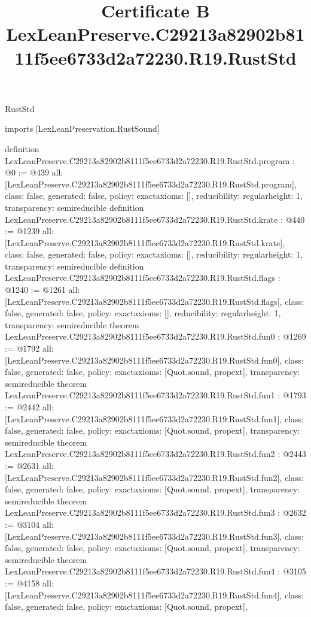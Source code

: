 \begin{lexlean}{RustStd}
\title{Certificate B LexLeanPreserve.C29213a82902b8111f5ee6733d2a72230.R19.RustStd}
\begin{coremodule}
imports [LexLeanPreservation.RustSound]

definition LexLeanPreserve.C29213a82902b8111f5ee6733d2a72230.R19.RustStd.program : @0 := @439 {
  all: [LexLeanPreserve.C29213a82902b8111f5ee6733d2a72230.R19.RustStd.program],
  class: false,
  generated: false,
  policy: exact{axioms: []},
  reducibility: regular{height: 1},
  transparency: semireducible
}
definition LexLeanPreserve.C29213a82902b8111f5ee6733d2a72230.R19.RustStd.krate : @440 := @1239 {
  all: [LexLeanPreserve.C29213a82902b8111f5ee6733d2a72230.R19.RustStd.krate],
  class: false,
  generated: false,
  policy: exact{axioms: []},
  reducibility: regular{height: 1},
  transparency: semireducible
}
definition LexLeanPreserve.C29213a82902b8111f5ee6733d2a72230.R19.RustStd.flags : @1240 := @1261 {
  all: [LexLeanPreserve.C29213a82902b8111f5ee6733d2a72230.R19.RustStd.flags],
  class: false,
  generated: false,
  policy: exact{axioms: []},
  reducibility: regular{height: 1},
  transparency: semireducible
}
theorem LexLeanPreserve.C29213a82902b8111f5ee6733d2a72230.R19.RustStd.fun0 : @1269 := @1792 {
  all: [LexLeanPreserve.C29213a82902b8111f5ee6733d2a72230.R19.RustStd.fun0],
  class: false,
  generated: false,
  policy: exact{axioms: [Quot.sound, propext]},
  transparency: semireducible
}
theorem LexLeanPreserve.C29213a82902b8111f5ee6733d2a72230.R19.RustStd.fun1 : @1793 := @2442 {
  all: [LexLeanPreserve.C29213a82902b8111f5ee6733d2a72230.R19.RustStd.fun1],
  class: false,
  generated: false,
  policy: exact{axioms: [Quot.sound, propext]},
  transparency: semireducible
}
theorem LexLeanPreserve.C29213a82902b8111f5ee6733d2a72230.R19.RustStd.fun2 : @2443 := @2631 {
  all: [LexLeanPreserve.C29213a82902b8111f5ee6733d2a72230.R19.RustStd.fun2],
  class: false,
  generated: false,
  policy: exact{axioms: [Quot.sound, propext]},
  transparency: semireducible
}
theorem LexLeanPreserve.C29213a82902b8111f5ee6733d2a72230.R19.RustStd.fun3 : @2632 := @3104 {
  all: [LexLeanPreserve.C29213a82902b8111f5ee6733d2a72230.R19.RustStd.fun3],
  class: false,
  generated: false,
  policy: exact{axioms: [Quot.sound, propext]},
  transparency: semireducible
}
theorem LexLeanPreserve.C29213a82902b8111f5ee6733d2a72230.R19.RustStd.fun4 : @3105 := @4158 {
  all: [LexLeanPreserve.C29213a82902b8111f5ee6733d2a72230.R19.RustStd.fun4],
  class: false,
  generated: false,
  policy: exact{axioms: [Quot.sound, propext]},
}
\end{coremodule}
\end{lexlean}
